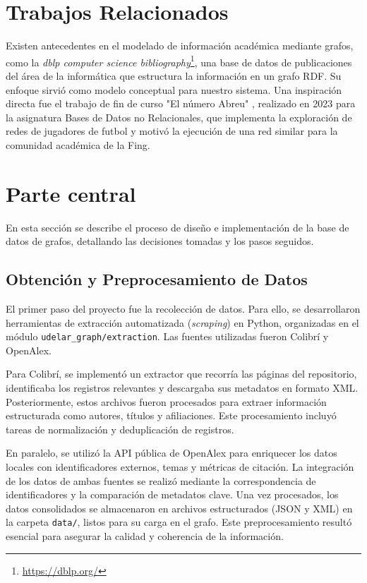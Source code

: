 \documentclass[journal]{IEEEtran}
\begin{document}
\section{Trabajos Relacionados}
\label{relacionados}
Existen antecedentes en el modelado de información académica mediante grafos, como la \textit{dblp computer science bibliography}\footnote{\url{https://dblp.org/}}, una base de datos de publicaciones del área de la informática que estructura la información en un grafo RDF. Su enfoque sirvió como modelo conceptual para nuestro sistema. Una inspiración directa fue el trabajo de fin de curso "El número Abreu" \cite{abreu2023}, realizado en 2023 para la asignatura Bases de Datos no Relacionales, que implementa la exploración de redes de jugadores de futbol y motivó la ejecución de una red similar para la comunidad académica de la Fing.

\section{Parte central}
\label{desarrollo}
En esta sección se describe el proceso de diseño e implementación de la base de datos de grafos, detallando las decisiones tomadas y los pasos seguidos.

\subsection{Obtención y Preprocesamiento de Datos}
El primer paso del proyecto fue la recolección de datos. Para ello, se desarrollaron herramientas de extracción automatizada (\textit{scraping}) en Python, organizadas en el módulo \texttt{udelar\_graph/extraction}. Las fuentes utilizadas fueron Colibrí y OpenAlex.

Para Colibrí, se implementó un extractor que recorría las páginas del repositorio, identificaba los registros relevantes y descargaba sus metadatos en formato XML. Posteriormente, estos archivos fueron procesados para extraer información estructurada como autores, títulos y afiliaciones. Este procesamiento incluyó tareas de normalización y deduplicación de registros.

En paralelo, se utilizó la API pública de OpenAlex para enriquecer los datos locales con identificadores externos, temas y métricas de citación. La integración de los datos de ambas fuentes se realizó mediante la correspondencia de identificadores y la comparación de metadatos clave. Una vez procesados, los datos consolidados se almacenaron en archivos estructurados (JSON y XML) en la carpeta \texttt{data/}, listos para su carga en el grafo. Este preprocesamiento resultó esencial para asegurar la calidad y coherencia de la información.
\end{document}
